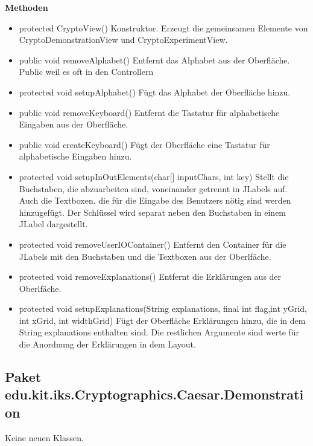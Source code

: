 \documentclass{article}
\begin{document}
    \textbf{Methoden}
      \begin{itemize}
        \item protected CryptoView()\newline
              Konstruktor. Erzeugt die gemeinsamen Elemente von CryptoDemonstrationView und CryptoExperimentView.
        \item public void removeAlphabet()\newline
              Entfernt das Alphabet aus der Oberfläche. Public weil es oft in den Controllern
        \item protected void setupAlphabet()\newline
              Fügt das Alphabet der Oberfläche hinzu.
        \item public void removeKeyboard()\newline
              Entfernt die Tastatur für alphabetische Eingaben aus der Oberfläche.
        \item public void createKeyboard()\newline
              Fügt der Oberfläche eine Tastatur für alphabetische Eingaben hinzu.
        \item protected void setupInOutElements(char[] inputChars, int key)\newline
              Stellt die Buchstaben, die abzuarbeiten sind, voneinander getrennt in JLabels auf. 
              Auch die Textboxen, die für die Eingabe des Benutzers nötig sind werden hinzugefügt.
              Der Schlüssel wird separat neben den Buchstaben in einem JLabel dargestellt.
        \item protected void removeUserIOContainer()\newline
              Entfernt den Container für die JLabels mit den Buchstaben und die Textboxen aus der Oberlfäche.
        \item protected void removeExplanations()\newline
              Entfernt die Erklärungen aus der Oberlfäche.
	\item protected void setupExplanations(String explanations, final int flag,int yGrid, int xGrid, int widthGrid)\newline
	      Fügt der Oberfläche Erklärungen hinzu, die in dem String explanations enthalten sind.
	      Die restlichen Argumente sind werte für die Anordnung der Erklärungen in dem Layout.      
      \end{itemize}

  \subsection{Paket edu.kit.iks.Cryptographics.Caesar.Demonstration}
   Keine neuen Klassen.
\end{document}
